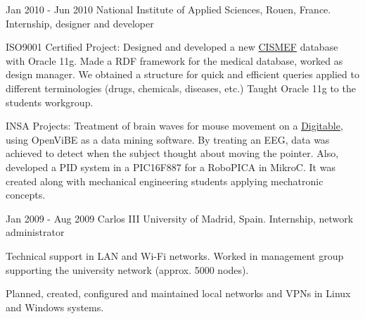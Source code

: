 \experience
  {Jan 2010 - Jun 2010}
  {National Institute of Applied Sciences, Rouen, France.}
  {Internship, designer and developer}
  {\vspace{-1em}\begin{rlist}
    \item ISO9001 Certified Project: Designed and developed a new \href{http://www.cismef.org}{CISMEF}
    database with Oracle 11g. Made a RDF
    framework for the medical database, worked as design manager. We obtained a
    structure for quick and efficient queries applied to different
    terminologies (drugs, chemicals, diseases, etc.)
    Taught Oracle 11g to the students workgroup.
    \item INSA Projects: Treatment of brain waves for mouse movement on a \href{http://digitable.imag.fr/}{Digitable}, using OpenViBE as a data mining software. By treating an EEG, data was achieved to detect when the subject thought about moving the pointer. Also, developed a PID system in a PIC16F887 for a RoboPICA in MikroC. It was created along with mechanical engineering students applying mechatronic concepts. 
  \end{rlist}}

\experience
  {Jan 2009 - Aug 2009}
  {Carlos III University of Madrid, Spain.}
  {Internship, network administrator}
  {\vspace{-1em}\begin{rlist}
    \item Technical support in LAN and Wi-Fi networks. Worked in management
    group supporting the university network (approx. 5000 nodes).
    \item Planned, created, configured and maintained local networks and
    VPNs in Linux and Windows systems.
  \end{rlist}}
